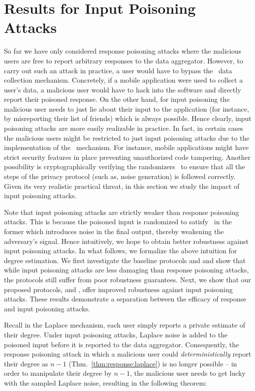\section{Results for Input Poisoning Attacks}\label{sec:input-attacks}
So far we have only considered response poisoning attacks where the malicious users are free to report arbitrary responses to the data aggregator. However, to carry out such an attack in practice, a user would have to bypass the \ldp~data collection mechanism. Concretely, if a mobile application were used to collect a user's data, a malicious user would have to hack into the software and directly report their poisoned response. On the other hand, for input poisoning the malicious user needs to just lie about their input  to the application (for instance, by misreporting their list of friends) which is always possible. Hence clearly, input poisoning attacks are more easily realizable in practice. In fact, in certain cases the malicious users might be restricted to just input poisoning attacks due to the implementation of the \ldp~mechanism. For instance, mobile applications might have strict security features in place preventing unauthorized code tampering.  Another possibility is cryptographically verifying the randomizers~\cite{Kato21} to ensure that all the steps of the privacy protocol (such as, noise generation) is followed correctly.  Given its very realistic practical threat, in this section we study the impact of input poisoning attacks. 

Note that input poisoning attacks are strictly weaker than response poisoning attacks. This is because the poisoned input is randomized  to satisfy \ldp~in the former which introduces noise in the final output, thereby weakening the adversary's signal. Hence intuitively, we hope to obtain better robustness against input poisoning attacks.  In what follows, we formalize the above intuition for degree estimation. We first investigate the baseline protocols \RLap{} and \DegRRNaive{} and show that while input poisoning attacks are less damaging than response poisoning attacks, the protocols still suffer from poor robustness guarantees. Next, we show that our proposed protocols, \DegRRCheck{} and \DegHybrid{}, offer improved robustness against input poisoning attacks. These results demonstrate a separation between the efficacy of response and input poisoning attacks.

Recall in the Laplace mechanism, each user simply reports a private estimate of their degree. Under input poisoning attacks, Laplace noise is added to the poisoned input before it is reported to the data aggregator. Consequently, the response poisoning attack in which a malicious user could \textit{deterministically} report their degree as $n-1$ (Thm.~\ref{thm:response:laplace}) is no longer possible -- in order to manipulate their degree by $n-1$, the malicious user needs to get lucky with the sampled Laplace noise, resulting in the following theorem:

